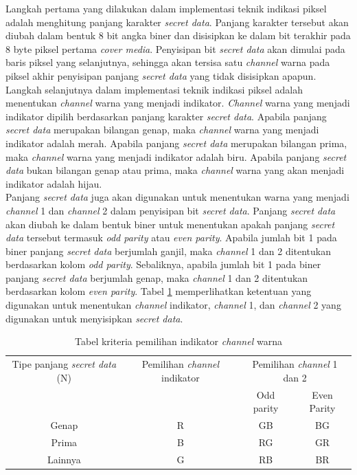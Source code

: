 \documentclass[a4paper,twoside]{article}
\begin{document}
\begin{enumerate}
\begin{itemize}
		Langkah pertama yang dilakukan dalam implementasi teknik indikasi piksel adalah menghitung panjang karakter \textit{secret data}. Panjang karakter tersebut akan diubah dalam bentuk 8 bit angka biner dan disisipkan ke dalam bit terakhir pada 8 byte piksel pertama \textit{cover media}. Penyisipan bit \textit{secret data} akan dimulai pada baris piksel yang selanjutnya, sehingga akan tersisa satu \textit{channel} warna pada piksel akhir penyisipan panjang \textit{secret data} yang tidak disisipkan apapun.\\
		
		 Langkah selanjutnya dalam implementasi teknik indikasi piksel adalah menentukan \textit{channel} warna yang menjadi indikator. \textit{Channel} warna yang menjadi indikator dipilih berdasarkan panjang karakter \textit{secret data}. Apabila panjang \textit{secret data} merupakan bilangan genap, maka \textit{channel} warna yang menjadi indikator adalah merah. Apabila panjang \textit{secret data} merupakan bilangan prima, maka \textit{channel} warna yang menjadi indikator adalah biru. Apabila panjang \textit{secret data} bukan bilangan genap atau prima, maka \textit{channel} warna yang akan menjadi indikator adalah hijau.\\
		 
		Panjang \textit{secret data} juga akan digunakan untuk menentukan warna yang menjadi \textit{channel} 1 dan \textit{channel} 2 dalam penyisipan bit \textit{secret data}. Panjang \textit{secret data} akan diubah ke dalam bentuk biner untuk menentukan apakah panjang \textit{secret data} tersebut termasuk \textit{odd parity} atau \textit{even parity}. Apabila jumlah bit 1 pada biner panjang \textit{secret data} berjumlah ganjil, maka \textit{channel} 1 dan 2 ditentukan berdasarkan kolom \textit{odd parity}. Sebaliknya, apabila jumlah bit 1 pada biner panjang \textit{secret data} berjumlah genap, maka \textit{channel} 1 dan 2 ditentukan berdasarkan kolom \textit{even parity}. Tabel \ref{tabelIndSel} memperlihatkan ketentuan yang digunakan untuk menentukan \textit{channel} indikator, \textit{channel} 1, dan \textit{channel} 2 yang digunakan untuk menyisipkan \textit{secret data}.\\
		
		\begin{table}[!htbp]
		\centering
		\caption{Tabel kriteria pemilihan indikator \textit{channel} warna} 
		\label{tabelIndSel}
		\begin{tabular}{| c | c | c | c |}
		\hline
		Tipe panjang \textit{secret data} (N) & Pemilihan \textit{channel} indikator & \multicolumn{2}{|c|}{Pemilihan \textit{channel} 1 dan 2}\\\cline{3-4}
		& & Odd parity & Even Parity\\
		\hline
		Genap & R & GB & BG\\
		\hline
		Prima & B & RG & GR\\
		\hline
		Lainnya & G & RB & BR\\
		\hline		
		\end{tabular}
		\end{table}
		

\end{itemize}
\end{enumerate}
\end{document}
